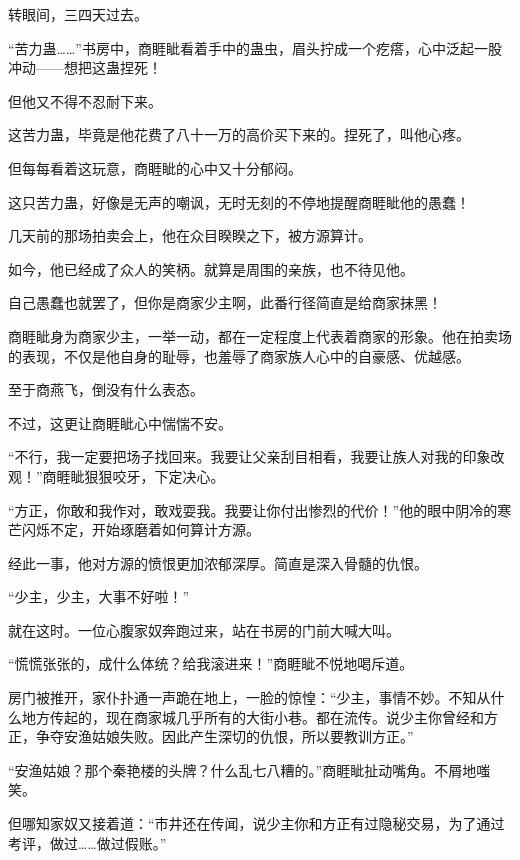 
\begin{this_body}



转眼间，三四天过去。

“苦力蛊……”书房中，商睚眦看着手中的蛊虫，眉头拧成一个疙瘩，心中泛起一股冲动——想把这蛊捏死！

但他又不得不忍耐下来。

这苦力蛊，毕竟是他花费了八十一万的高价买下来的。捏死了，叫他心疼。

但每每看着这玩意，商睚眦的心中又十分郁闷。

这只苦力蛊，好像是无声的嘲讽，无时无刻的不停地提醒商睚眦他的愚蠢！

几天前的那场拍卖会上，他在众目睽睽之下，被方源算计。

如今，他已经成了众人的笑柄。就算是周围的亲族，也不待见他。

自己愚蠢也就罢了，但你是商家少主啊，此番行径简直是给商家抹黑！

商睚眦身为商家少主，一举一动，都在一定程度上代表着商家的形象。他在拍卖场的表现，不仅是他自身的耻辱，也羞辱了商家族人心中的自豪感、优越感。

至于商燕飞，倒没有什么表态。

不过，这更让商睚眦心中惴惴不安。

“不行，我一定要把场子找回来。我要让父亲刮目相看，我要让族人对我的印象改观！”商睚眦狠狠咬牙，下定决心。

“方正，你敢和我作对，敢戏耍我。我要让你付出惨烈的代价！”他的眼中阴冷的寒芒闪烁不定，开始琢磨着如何算计方源。

经此一事，他对方源的愤恨更加浓郁深厚。简直是深入骨髓的仇恨。

“少主，少主，大事不好啦！”

就在这时。一位心腹家奴奔跑过来，站在书房的门前大喊大叫。

“慌慌张张的，成什么体统？给我滚进来！”商睚眦不悦地喝斥道。

房门被推开，家仆扑通一声跪在地上，一脸的惊惶：“少主，事情不妙。不知从什么地方传起的，现在商家城几乎所有的大街小巷。都在流传。说少主你曾经和方正，争夺安渔姑娘失败。因此产生深切的仇恨，所以要教训方正。”

“安渔姑娘？那个秦艳楼的头牌？什么乱七八糟的。”商睚眦扯动嘴角。不屑地嗤笑。

但哪知家奴又接着道：“市井还在传闻，说少主你和方正有过隐秘交易，为了通过考评，做过……做过假账。”


\end{this_body}
